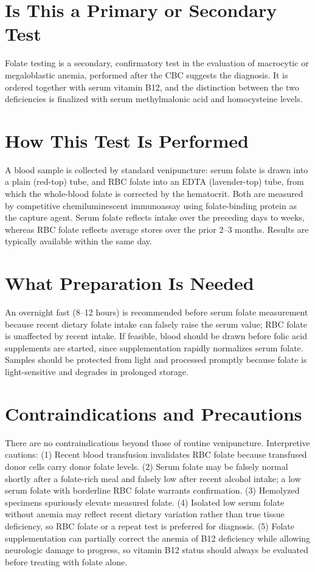 \section*{Is This a Primary or Secondary Test}
Folate testing is a secondary, confirmatory test in the evaluation of macrocytic or megaloblastic anemia, performed after the CBC suggests the diagnosis. It is ordered together with serum vitamin B12, and the distinction between the two deficiencies is finalized with serum methylmalonic acid and homocysteine levels.
\section*{How This Test Is Performed}
A blood sample is collected by standard venipuncture: serum folate is drawn into a plain (red-top) tube, and RBC folate into an EDTA (lavender-top) tube, from which the whole-blood folate is corrected by the hematocrit. Both are measured by competitive chemiluminescent immunoassay using folate-binding protein as the capture agent. Serum folate reflects intake over the preceding days to weeks, whereas RBC folate reflects average stores over the prior 2--3 months. Results are typically available within the same day.
\section*{What Preparation Is Needed}
An overnight fast (8--12 hours) is recommended before serum folate measurement because recent dietary folate intake can falsely raise the serum value; RBC folate is unaffected by recent intake. If feasible, blood should be drawn before folic acid supplements are started, since supplementation rapidly normalizes serum folate. Samples should be protected from light and processed promptly because folate is light-sensitive and degrades in prolonged storage.
\section*{Contraindications and Precautions}
There are no contraindications beyond those of routine venipuncture. Interpretive cautions: (1) Recent blood transfusion invalidates RBC folate because transfused donor cells carry donor folate levels. (2) Serum folate may be falsely normal shortly after a folate-rich meal and falsely low after recent alcohol intake; a low serum folate with borderline RBC folate warrants confirmation. (3) Hemolyzed specimens spuriously elevate measured folate. (4) Isolated low serum folate without anemia may reflect recent dietary variation rather than true tissue deficiency, so RBC folate or a repeat test is preferred for diagnosis. (5) Folate supplementation can partially correct the anemia of B12 deficiency while allowing neurologic damage to progress, so vitamin B12 status should always be evaluated before treating with folate alone.
